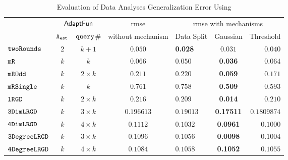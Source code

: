 {\footnotesize
\begin {table}[t]
        \vspace{-0.5cm}
        \caption{Evaluation of Data Analyses Generalization Error Using {\THESYSTEM}}
    \vspace{-0.4cm}
        \label{tb:adapt-generalization}
        \begin{center}
        \centering
{
        \begin{tabular}{|| >{\tiny}l || c | c || c || l | c | r ||  }
                \hhline{t|:======= :t:|}
        \multirow{2}{*}{Program $c$}
         & \multicolumn{2}{c||}{$\textsf{AdaptFun}$}
         & {rmse}
         & \multicolumn{3}{c||}{rmse with mechanisms} \\ 
         \hhline{||~--||~---||}
         & {${\mathtt{A_{est}}}$ } & {${\tt query}$\# } &  without mechanism & Data Split & Gaussian & Threshold  \\ 
         \hline \hline
        $  \mathtt{ twoRounds }$ & $ 2 $ & $  k + 1 $ & $0.050$   & {\textbf{0.028}} & {$0.031$} & $0.040$  \\
        \hhline{||-||--||-||---||}
         $  \mathtt{ mR}$ & $k$ & $k$ & $0.066$   & $0.050$ & {\textbf{0.036}} & $0.064$  \\
         \hhline{||-||--||-||---||}
         $  \mathtt{ mROdd }$ & $ k $ & $  2 \times k $ & $0.211$   & $0.220$ & {\textbf{0.059}} & $0.171$  \\
         \hhline{||-||--||-||---||}
         $  \mathtt{ mRSingle }$ & $ k $ & $  k $ & $ 0.761$   & $ 0.758$ & {\textbf{0.509}} & $ 0.593$  \\
         \hhline{||-||--||-||---||}
         $  \mathtt{ lRGD }$ & $ k $ & $  2\times k $ & $0.216$   & $0.209$ & \textbf{0.014} & $0.210$  \\
         \hhline{||-||--||-||---||}
         $  \mathtt{ 3DimLRGD }$ & $ k $ & $  3\times k $ & $0.196613$   & $0.19013$ & \textbf{0.17511} & $0.1809874$  \\
         \hhline{||-||--||-||---||}
         $  \mathtt{ 4DimLRGD }$ & $ k $ & $  4\times k $ & $0.1112$   & $0.1032$ & \textbf{0.0961} & $0.1000$  \\
         \hhline{||-||--||-||---||}
         $  \mathtt{ 3DegreeLRGD }$ & $ k $ & $  3\times k $ & $0.1096$   & $0.1056$ & \textbf{0.0098} & $0.1004$  \\
         \hhline{||-||--||-||---||}
         $  \mathtt{ 4DegreeLRGD }$ & $ k $ & $  4\times k $ & $0.1084$   & $0.1058$ & \textbf{0.1052} & $0.1055$  \\

\end{tabular}}
\end{center}
\end{table}}
